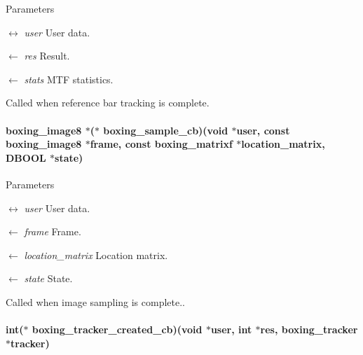 \begin{DoxyParams}{Parameters}
\item[\mbox{$\leftrightarrow$} {\em user}]User data. \item[\mbox{$\leftarrow$} {\em res}]Result. \item[\mbox{$\leftarrow$} {\em stats}]MTF statistics.\end{DoxyParams}
Called when reference bar tracking is complete. \hypertarget{group__unboxer_gad341bfd9895ae5c55c2697a388a898ce}{
\paragraph[{boxing\_\-sample\_\-cb}]{\setlength{\rightskip}{0pt plus 5cm}boxing\_\-image8 $\ast$($\ast$ {\bf boxing\_\-sample\_\-cb})(void $\ast$user, const boxing\_\-image8 $\ast$frame, const boxing\_\-matrixf $\ast$location\_\-matrix, DBOOL $\ast$state)}\hfill}
\label{group__unboxer_gad341bfd9895ae5c55c2697a388a898ce}

\begin{DoxyParams}{Parameters}
\item[\mbox{$\leftrightarrow$} {\em user}]User data. \item[\mbox{$\leftarrow$} {\em frame}]Frame. \item[\mbox{$\leftarrow$} {\em location\_\-matrix}]Location matrix. \item[\mbox{$\leftarrow$} {\em state}]State.\end{DoxyParams}
Called when image sampling is complete.. \hypertarget{group__unboxer_gabdf338be152e0494e1e3da7a73164c59}{
\paragraph[{boxing\_\-tracker\_\-created\_\-cb}]{\setlength{\rightskip}{0pt plus 5cm}int($\ast$ {\bf boxing\_\-tracker\_\-created\_\-cb})(void $\ast$user, int $\ast$res, boxing\_\-tracker $\ast$tracker)}\hfill}
\label{group__unboxer_gabdf338be152e0494e1e3da7a73164c59}

